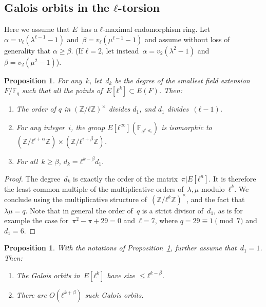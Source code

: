 \documentclass{lms}
\newtheorem{prop}[thm]{Proposition}
\newcommand{\F}{\mathbb{F}}
\begin{document}
\subsection{Galois orbits in the $ℓ$-torsion}
Here we assume that $E$~has a $ℓ$-maximal endomorphism ring.
Let~$α = v_{ℓ} (λ^{ℓ-1}-1)$ and~$β = v_{ℓ} (μ^{ℓ-1}-1)$
and assume without loss of generality that $α ≥ β$.
(If $ℓ = 2$, let instead~$α = v_2 (λ^2-1)$ and~$β = v_2(μ^2-1)$).
\label{sub:orbits}
\begin{prop}\label{prop:degree-l-torsion}
For any~$k$, let~$d_k$ be the degree of the smallest field extension $F/\F_q$
such that all the points of~$E[ℓ^k]⊂E(F)$. Then:
\begin{enumerate}
\item The order of $q$ in $(ℤ/ℓℤ)^×$ divides $d_1$,
and $d_1$ divides~$(ℓ-1)$.
\item %
For any integer~$i$, the group $E[ℓ^∞](\F_{q^{ℓ^i · d_1}})$
is isomorphic to~$(ℤ/ℓ^{i+α} ℤ) × (ℤ/ℓ^{i + β} ℤ)$.
\item %
For all~$k ≥ β$, $d_k = ℓ^{k-β} d_1$.
\end{enumerate}
\end{prop}
\begin{proof}
The degree~$d_k$ is exactly the order of the matrix~$π|E[ℓ^n]$.
It is therefore the least common multiple of the multiplicative orders
of~$λ, μ$ modulo~$ℓ^k$.
We conclude using the multiplicative structure of~$(ℤ/ℓ^k ℤ)^×$, and the fact
that $λμ=q$.
Note that in general the order of~$q$ is a strict divisor of~$d_1$,
as is for example the case for~$π^2 - π + 29 = 0$ and~$ℓ = 7$,
where $q = 29 ≡ 1 \pmod{7}$ and $d_1 = 6$.
\end{proof}
\begin{prop}\label{prop:bound-orbits}
With the notations of Proposition~\ref{prop:degree-l-torsion},
further assume that~$d_1 = 1$. Then:
\begin{enumerate}
\item The Galois orbits in~$E[ℓ^k]$ have size $≤ ℓ^{k - β}$.
\item There are $O(ℓ^{k+β})$ such Galois orbits.
\end{enumerate}
\end{prop}
\end{document}
